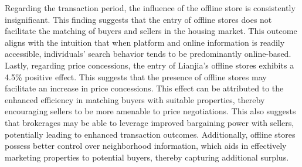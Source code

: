 \documentclass[11pt]{article}
\begin{document}
Regarding the transaction period, the influence of the offline store is consistently insignificant. This finding suggests that the entry of offline stores does not facilitate the matching of buyers and sellers in the housing market. This outcome aligns with the intuition that when platform and online information is readily accessible, individuals' search behavior tends to be predominantly online-based. Lastly, regarding price concessions, the entry of Lianjia's offline stores exhibits a 4.5\% positive effect. This suggests that the presence of offline stores may facilitate an increase in price concessions. This effect can be attributed to the enhanced efficiency in matching buyers with suitable properties, thereby encouraging sellers to be more amenable to price negotiations. This also suggests that brokerages may be able to leverage improved bargaining power with sellers, potentially leading to enhanced transaction outcomes. Additionally, offline stores possess better control over neighborhood information, which aids in effectively marketing properties to potential buyers, thereby capturing additional surplus. 
\end{document}
